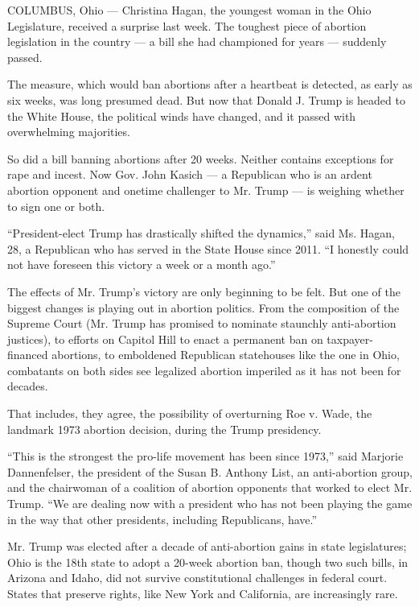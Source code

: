 COLUMBUS, Ohio --- Christina Hagan, the youngest woman in the Ohio
Legislature, received a surprise last week. The toughest piece of
abortion legislation in the country --- a bill she had championed for
years --- suddenly passed.

The measure, which would ban abortions after a heartbeat is detected, as
early as six weeks, was long presumed dead. But now that Donald J. Trump
is headed to the White House, the political winds have changed, and it
passed with overwhelming majorities.

So did a bill banning abortions after 20 weeks. Neither contains
exceptions for rape and incest. Now Gov. John Kasich --- a Republican
who is an ardent abortion opponent and onetime challenger to Mr. Trump
--- is weighing whether to sign one or both.

``President-elect Trump has drastically shifted the dynamics,'' said Ms.
Hagan, 28, a Republican who has served in the State House since 2011.
``I honestly could not have foreseen this victory a week or a month
ago.''

The effects of Mr. Trump's victory are only beginning to be felt. But
one of the biggest changes is playing out in abortion politics. From the
composition of the Supreme Court (Mr. Trump has promised to nominate
staunchly anti-abortion justices), to efforts on Capitol Hill to enact a
permanent ban on taxpayer-financed abortions, to emboldened Republican
statehouses like the one in Ohio, combatants on both sides see legalized
abortion imperiled as it has not been for decades.

That includes, they agree, the possibility of overturning Roe v. Wade,
the landmark 1973 abortion decision, during the Trump presidency.

``This is the strongest the pro-life movement has been since 1973,''
said Marjorie Dannenfelser, the president of the Susan B. Anthony List,
an anti-abortion group, and the chairwoman of a coalition of abortion
opponents that worked to elect Mr. Trump. ``We are dealing now with a
president who has not been playing the game in the way that other
presidents, including Republicans, have.''

Mr. Trump was elected after a decade of anti-abortion gains in state
legislatures; Ohio is the 18th state to adopt a 20-week abortion ban,
though two such bills, in Arizona and Idaho, did not survive
constitutional challenges in federal court. States that preserve rights,
like New York and California, are increasingly rare.

